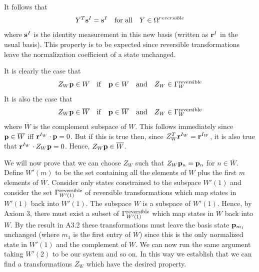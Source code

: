 \documentclass[12pt]{article}
\begin{document}
It follows that
\begin{equation}
Y^T{\bf s}^I ={\bf s}^I ~~~ {\rm for~all}~~~ Y\in\Omega^{reversible}
\end{equation}
where ${\bf s}^I$ is the identity measurement in this new basis (written
as ${\bf r}^I$ in the usual basis). This property is to be expected
since reversible transformations leave the normalization coefficient of
a state unchanged.

\vspace{4mm}


\vspace{4mm}

It is clearly the case that
\begin{equation}
Z_W {\bf p}\in W ~~~ {\rm if} ~~~ {\bf p}\in W  ~~~
{\rm and}~~~   Z_W\in\Gamma_W^{\rm reversible}
\end{equation}
It is also the case that
\begin{equation}
Z_W {\bf p}\in\overline{W} ~~~{\rm if}~~~ {\bf p}\in \overline{W}  ~~~
{\rm and}~~~   Z_W\in\Gamma_W^{\rm reversible}
\end{equation}
where $\overline{W}$ is the complement subspace of  $W$.
This follows immediately since ${\bf p}\in\overline{W}$ iff ${\bf
r}^{I_W}\cdot{\bf p}=0$.  But if this is true then, since $Z_W^T{\bf
r}^{I_W}={\bf r}^{I_W}$, it is also true that ${\bf
r}^{I_W}\cdot Z_W{\bf p}=0$. Hence, $Z_W{\bf p}\in\overline{W}$.

\vspace{4mm}


\vspace{4mm}

We will now prove that we can choose $Z_W$ such that $Z_W{\bf p}_n={\bf
p}_n$ for $n\in\overline{W}$.  Define $W'(m)$ to be the set containing
all the elements of $W$ plus the first $m$ elements of $\overline{W}$.
Consider only states constrained to the subspace $W'(1)$ and consider
the set $\Gamma^{\rm reversible}_{W'(1)}$ of reversible transformations
which map states in $W'(1)$ back into $W'(1)$.
The subspace $W$ is a subspace of $W'(1)$. Hence, by Axiom 3, there must
exist a subset of $\Gamma^{\rm reversible}_{W'(1)}$ which map states in
$W$ back into $W$.  By the result in A3.2 these transformations must
leave the basis state ${\bf p}_{m_1}$ unchanged (where $m_1$ is the
first entry of $\overline{W}$) since this is the only normalized state
in $W'(1)$ and the complement of $W$.  We can now run the same argument
taking $W'(2)$ to be our system and so on. In this way we establish that
we can find a transformations $Z_W$ which have the desired property.
\end{document}
